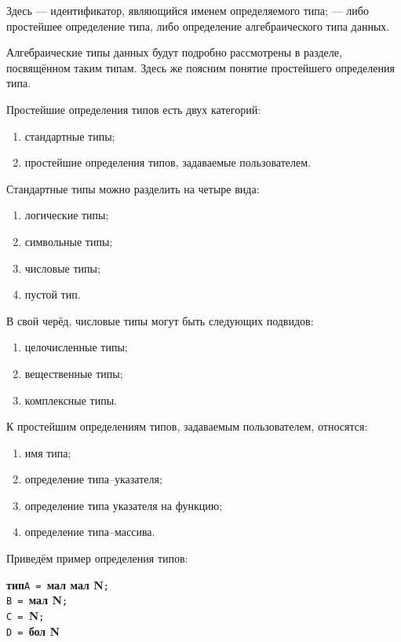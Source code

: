 \documentclass[10pt]{report}
\begin{document}
Здесь \textcolor{Green}{} --- идентификатор, являющийся именем определяемого типа; \textcolor{Green}{} --- либо
простейшее определение типа, либо определение алгебраического типа данных.

Алгебраические типы данных будут подробно рассмотрены в разделе, посвящённом таким типам. Здесь же поясним понятие простейшего определения типа.

Простейшие определения типов есть двух категорий:
\begin{enumerate}
    \item стандартные типы;
    \item простейшие определения типов, задаваемые пользователем.
\end{enumerate}

Стандартные типы можно разделить на четыре вида:
\begin{enumerate}
    \item логические типы;
    \item символьные типы;
    \item числовые типы;
    \item пустой тип.
\end{enumerate}

В свой черёд, числовые типы могут быть следующих подвидов:
\begin{enumerate}
    \item целочисленные типы;
    \item вещественные типы;
    \item комплексные типы.
\end{enumerate}

К простейшим определениям типов, задаваемым пользователем, относятся:
\begin{enumerate}
    \item имя типа;
    \item определение типа--указателя;
    \item определение типа указателя на функцию;
    \item определение типа--массива.
\end{enumerate}

Приведём пример определения типов:

\noindent\textbf{тип}\phantom{m}\texttt{A = }\textbf{мал мал N}\texttt{;}\\
\phantom{типm}\texttt{B = }\textbf{мал N}\texttt{;}\\
\phantom{типm}\texttt{C = }\textbf{N}\texttt{;}\\
\phantom{типm}\texttt{D = }\textbf{бол N}
\end{document}
